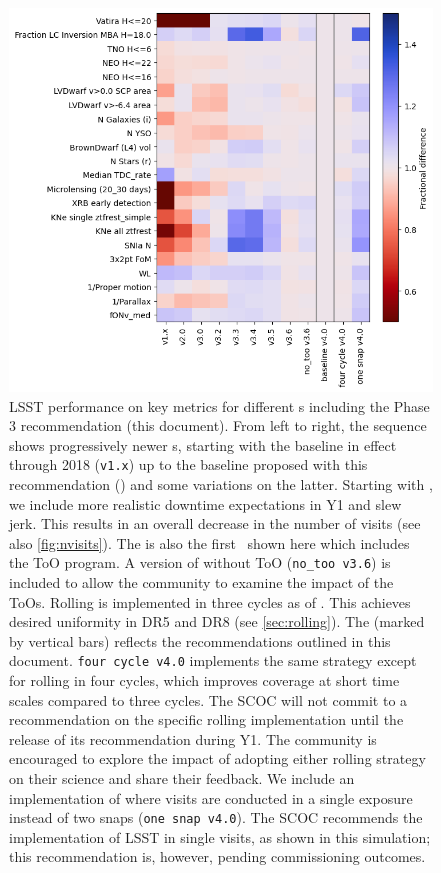 \begin{figure}
    \centering
    \includegraphics[width=0.9\linewidth]{figures/scoc_heatmap.png}
    \caption{LSST performance on key metrics for different \opsim s including the Phase 3 recommendation (this document). From left to right, the sequence shows progressively newer \opsim s, starting with the baseline in effect through 2018 (\texttt{v1.x}) up to the baseline proposed with this recommendation () and some variations on the latter. Starting with , we include more realistic downtime expectations in Y1 and slew jerk. This results in an overall decrease in the number of visits (see also \autoref{fig:nvisits}). The  is also the first \opsim\ shown here which includes the ToO program. A version of  without ToO (\texttt{no\_too v3.6}) is included to allow the community to examine the impact of the ToOs. Rolling is implemented in three cycles as of . This achieves desired uniformity in DR5 and DR8 (see \autoref{sec:rolling}). The  (marked by vertical bars) reflects the recommendations outlined in this document. \texttt{four cycle v4.0} implements the same strategy except for rolling in four cycles, which improves coverage at short time scales compared to three cycles.  The SCOC will not commit to a recommendation on the specific rolling implementation until the release of its recommendation during Y1. The community is encouraged to explore the impact of adopting either rolling strategy on their science and share their feedback.  We include an implementation of  where visits are conducted in a single exposure instead of two snaps (\texttt{one snap v4.0}). The SCOC recommends the implementation of LSST in single visits, as shown in this simulation; this recommendation is, however, pending commissioning outcomes.}
    \label{fig:summary}
\end{figure}

